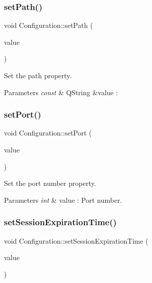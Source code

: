\subsubsection{\texorpdfstring{set\+Path()}{setPath()}}
{\footnotesize\ttfamily void Configuration\+::set\+Path (\begin{DoxyParamCaption}\item[{const Q\+String \&}]{value }\end{DoxyParamCaption})}



Set the path property. 


\begin{DoxyParams}{Parameters}
{\em const} & Q\+String \&value \+: \\
\hline
\end{DoxyParams}
\mbox{\label{class_configuration_aae5aafdfeb2a6e110ef8bad90a85be5e}} 
\subsubsection{\texorpdfstring{set\+Port()}{setPort()}}
{\footnotesize\ttfamily void Configuration\+::set\+Port (\begin{DoxyParamCaption}\item[{int}]{value }\end{DoxyParamCaption})}



Set the port number property. 


\begin{DoxyParams}{Parameters}
{\em int} & value \+: Port number. \\
\hline
\end{DoxyParams}
\mbox{\label{class_configuration_a306d88e7d7c2b8394844936b49be9013}} 
\subsubsection{\texorpdfstring{set\+Session\+Expiration\+Time()}{setSessionExpirationTime()}}
{\footnotesize\ttfamily void Configuration\+::set\+Session\+Expiration\+Time (\begin{DoxyParamCaption}\item[{int}]{value }\end{DoxyParamCaption})}



